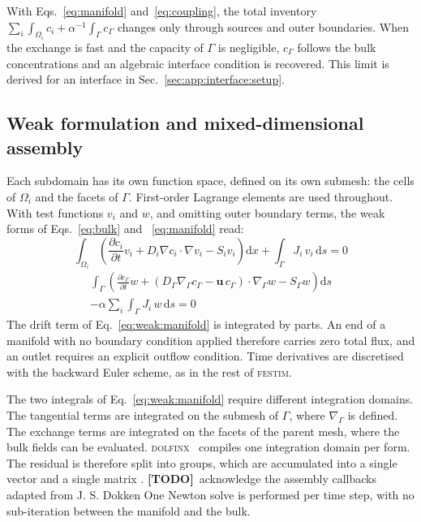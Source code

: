 \documentclass[5p]{elsarticle}
\newcommand{\FESTIM}{\textsc{festim}}
\newcommand{\gradG}{\nabla_{\Gamma}}  %
\newcommand{\TODO}[1]{\textcolor{BrickRed}{\textbf{[TODO]}~#1}}
\begin{document}
With Eqs.~\ref{eq:manifold} and~\ref{eq:coupling}, the total inventory $\sum_i \int_{\Omega_i} c_i + \alpha^{-1} \int_\Gamma c_\Gamma$ changes only through sources and outer boundaries.
When the exchange is fast and the capacity of $\Gamma$ is negligible, $c_\Gamma$ follows the bulk concentrations and an algebraic interface condition is recovered.
This limit is derived for an interface in Sec.~\ref{sec:app:interface:setup}.

\subsection{Weak formulation and mixed-dimensional assembly}
\label{sec:method:weak}

Each subdomain has its own function space, defined on its own submesh: the cells of $\Omega_i$ and the facets of $\Gamma$.
First-order Lagrange elements are used throughout.
With test functions $v_i$ and $w$, and omitting outer boundary terms, the weak forms of Eqs.~\ref{eq:bulk} and ~\ref{eq:manifold} read:
\begin{equation}
    \int_{\Omega_i} \left( \frac{\partial c_i}{\partial t} v_i + D_i \nabla c_i \cdot \nabla v_i - S_i v_i \right) \mathrm{d}x + \int_\Gamma J_i\, v_i \,\mathrm{d}s = 0
    \label{eq:weak:bulk}
\end{equation}
\begin{multline}
    \int_\Gamma \left( \frac{\partial c_\Gamma}{\partial t} w + \left( D_\Gamma \gradG c_\Gamma - \mathbf{u}\, c_\Gamma \right) \cdot \gradG w - S_\Gamma w \right) \mathrm{d}s \\
    - \alpha \sum_i \int_\Gamma J_i\, w \,\mathrm{d}s = 0
    \label{eq:weak:manifold}
\end{multline}
The drift term of Eq.~\ref{eq:weak:manifold} is integrated by parts.
An end of a manifold with no boundary condition applied therefore carries zero total flux, and an outlet requires an explicit outflow condition.
Time derivatives are discretised with the backward Euler scheme, as in the rest of \FESTIM{}.

The two integrals of Eq.~\ref{eq:weak:manifold} require different integration domains.
The tangential terms are integrated on the submesh of $\Gamma$, where $\gradG$ is defined.
The exchange terms are integrated on the facets of the parent mesh, where the bulk fields can be evaluated.
\textsc{dolfinx}~\cite{baratta_dolfinx_2023} compiles one integration domain per form.
The residual is therefore split into groups, which are accumulated into a single vector and a single matrix \cite{dokken_scifem_2025}. \TODO{acknowledge the assembly callbacks adapted from J. S. Dokken}
One Newton solve is performed per time step, with no sub-iteration between the manifold and the bulk.
\end{document}
